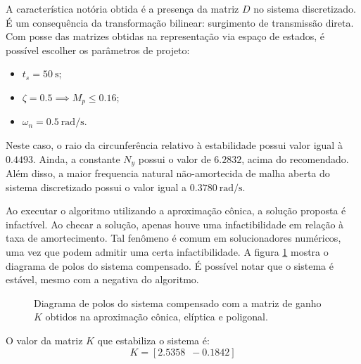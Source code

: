 A característica notória obtida é a presença da matriz $D$ no sistema discretizado. É um consequência da transformação bilinear: surgimento de transmissão direta. Com posse das matrizes obtidas na representação via espaço de estados, é possível escolher os parâmetros de projeto:
\begin{itemize}
  \item $t_s = \SI{50}{\second}$;
  \item $\zeta = 0.5 \implies M_p \leq 0.16$;
  \item $\omega_n = \SI{0.5}{\radian/\second}$.
\end{itemize}

Neste caso, o raio da circunferência relativo à estabilidade possui valor igual à $0.4493$. Ainda, a constante $N_y$ possui o valor de $6.2832$, acima do recomendado. Além disso, a maior frequencia natural não-amortecida de malha aberta do sistema discretizado possui o valor igual a $\SI{0.3780}{\radian/\second}$.

Ao executar o algoritmo utilizando a aproximação cônica, a solução proposta é infactível. Ao checar a solução, apenas houve uma infactibilidade em relação à taxa de amortecimento. Tal fenômeno é comum em solucionadores numéricos, uma vez que podem admitir uma certa infactibilidade. A figura \ref{subfig:TesteC} mostra o diagrama de polos do sistema compensado. É possível notar que o sistema é estável, mesmo com a negativa do algoritmo.

\begin{figure}[!ht]
  \centering
  \begin{subfigure}[t]{0.3\columnwidth}
    
      \caption{}
      \label{subfig:TesteC}
  \end{subfigure}
  \begin{subfigure}[t]{0.3\columnwidth}
    
      \caption{}
      \label{subfig:TesteE}
  \end{subfigure}
  \begin{subfigure}[t]{0.3\columnwidth}
    
    \caption{}
    \label{subfig:TesteP}
  \end{subfigure}
  \caption{Diagrama de polos do sistema compensado com a matriz de ganho $K$ obtidos na aproximação cônica,  elíptica e  poligonal.}
  \label{fig:PrimeiroTeste}
\end{figure}

O valor da matriz $K$ que estabiliza o sistema é:
\begin{equation}
  K = \left[2.5358 \enspace -0.1842\right]\label{res:GanhoC}
\end{equation}

